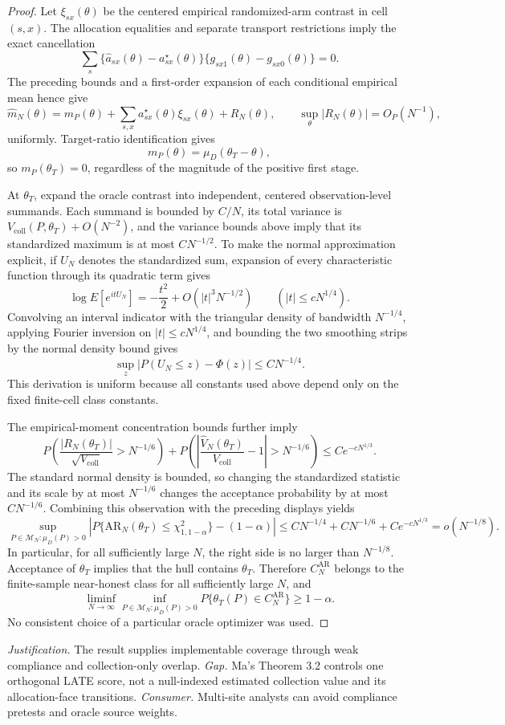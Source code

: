 \documentclass{article}
\begin{document}
\begin{proof}
Let \(\xi_{sx}(\theta)\) be the centered empirical randomized-arm contrast in cell \((s,x)\). The allocation equalities and separate transport restrictions imply the exact cancellation
\[
 \sum_s\{\widehat a_{sx}(\theta)-a_{sx}^{\star}(\theta)\}
 \{g_{sx1}(\theta)-g_{sx0}(\theta)\}=0.
\]
The preceding bounds and a first-order expansion of each conditional empirical mean hence give
\[
 \widehat m_N(\theta)
 =m_P(\theta)+
 \sum_{s,x}a_{sx}^{\star}(\theta)\xi_{sx}(\theta)+R_N(\theta),
 \qquad
 \sup_\theta|R_N(\theta)|=O_P(N^{-1}),
\]
uniformly. Target-ratio identification gives
\[
 m_P(\theta)=\mu_D(\theta_T-\theta),
\]
so \(m_P(\theta_T)=0\), regardless of the magnitude of the positive first stage.

At \(\theta_T\), expand the oracle contrast into independent, centered observation-level summands. Each summand is bounded by \(C/N\), its total variance is \(V_{\mathrm{coll}}(P,\theta_T)+O(N^{-2})\), and the variance bounds above imply that its standardized maximum is at most \(CN^{-1/2}\). To make the normal approximation explicit, if \(U_N\) denotes the standardized sum, expansion of every characteristic function through its quadratic term gives
\[
 \log E[e^{itU_N}]=-\frac{t^2}{2}+O(|t|^3N^{-1/2})
 \qquad (|t|\le cN^{1/4}).
\]
Convolving an interval indicator with the triangular density of bandwidth \(N^{-1/4}\), applying Fourier inversion on \(|t|\le cN^{1/4}\), and bounding the two smoothing strips by the normal density bound gives
\[
 \sup_z\left|P(U_N\le z)-\Phi(z)\right|\le CN^{-1/4}.
\]
This derivation is uniform because all constants used above depend only on the fixed finite-cell class constants.

The empirical-moment concentration bounds further imply
\[
 P\left(\frac{|R_N(\theta_T)|}{\sqrt{V_{\mathrm{coll}}}}>N^{-1/6}\right)
 +P\left(\left|\frac{\widehat V_N(\theta_T)}
 {V_{\mathrm{coll}}}-1\right|>N^{-1/6}\right)
 \le Ce^{-cN^{1/3}}.
\]
The standard normal density is bounded, so changing the standardized statistic and its scale by at most \(N^{-1/6}\) changes the acceptance probability by at most \(CN^{-1/6}\). Combining this observation with the preceding displays yields
\[
 \sup_{P\in\mathcal M_N:\mu_D(P)>0}
 \left|P\{\mathrm{AR}_N(\theta_T)\le\chi^2_{1,1-\alpha}\}
 -(1-\alpha)\right|
 \le CN^{-1/4}+CN^{-1/6}+Ce^{-cN^{1/3}}
 =o(N^{-1/8}).
\]
In particular, for all sufficiently large \(N\), the right side is no larger than \(N^{-1/8}\). Acceptance of \(\theta_T\) implies that the hull contains \(\theta_T\). Therefore \(C_N^{\mathrm{AR}}\) belongs to the finite-sample near-honest class for all sufficiently large \(N\), and
\[
 \liminf_{N\to\infty}\inf_{P\in\mathcal M_N:\mu_D(P)>0}
 P\{\theta_T(P)\in C_N^{\mathrm{AR}}\}\ge1-\alpha.
\]
No consistent choice of a particular oracle optimizer was used.
\end{proof}
\par\smallskip\noindent \textit{Justification.} The result supplies implementable coverage through weak compliance and collection-only overlap. \textit{Gap.} Ma's Theorem 3.2 controls one orthogonal LATE score, not a null-indexed estimated collection value and its allocation-face transitions. \textit{Consumer.} Multi-site analysts can avoid compliance pretests and oracle source weights.
\end{document}

